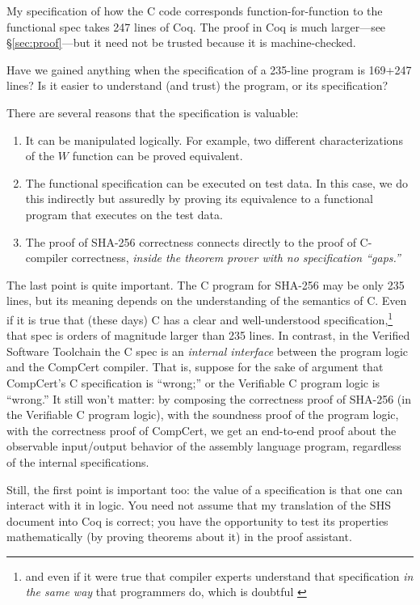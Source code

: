 \documentclass[prodmode,acmtoplas]{acmsmall}
\begin{document}
My specification of how the C code corresponds
function-for-function to the functional spec
takes 247 lines of Coq.  The proof in Coq is much
larger---see \S\ref{sec:proof}---but it need not be trusted
because it is machine-checked.

Have we gained anything when the specification of a 
235-line program is 169+247 lines?  Is it easier to understand
(and trust) the program, or its specification?

There are several reasons that the specification is valuable:
\begin{enumerate}
\item It can be manipulated logically.  For example, two different
characterizations of the $W$ function can be proved equivalent.
\item The functional specification can be executed on test data.
In this case, we do this indirectly but assuredly by proving its
equivalence to a functional program that executes on the test data.
\item The proof of SHA-256 correctness connects directly to the
proof of C-compiler correctness, \emph{inside the theorem prover
with no specification ``gaps.''}
\end{enumerate}

The last point is quite important.  The C program for SHA-256 may be
only 235 lines, but its meaning depends on the understanding of
the semantics of C.  Even if it is true that (these days) C has a clear and
well-understood specification,\footnote{and even if it were
true that compiler experts understand that specification
\emph{in the same way} that programmers do, which is doubtful \cite{wang2013towards}}
that spec is orders of magnitude larger
than 235 lines.  In contrast, in the Verified Software Toolchain
the C spec is an \emph{internal interface} between the program logic
and the CompCert compiler.  That is, suppose for the sake of argument
that CompCert's C specification is ``wrong;'' or the Verifiable C
program logic is ``wrong.''   It still won't matter:
by composing the correctness proof of SHA-256 (in the Verifiable C program
logic), with the soundness proof of the program logic,
with the correctness proof of CompCert, we get an end-to-end proof
about the observable input/output behavior of the assembly language program,
regardless of the internal specifications.

Still, the first point is important too:  the value of a specification
is that one can interact with it in logic.  You need not assume that
my translation of the SHS document into Coq is correct;
you have the opportunity to test its properties mathematically
(by proving theorems about it) in the proof assistant.
\end{document}
